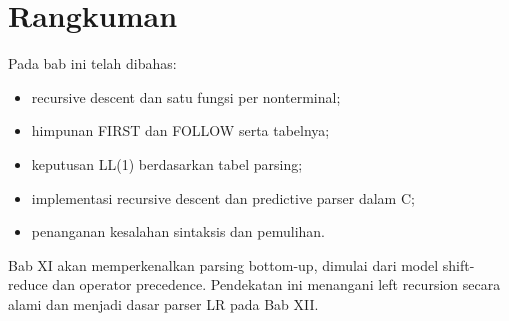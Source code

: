 \section*{Rangkuman}

Pada bab ini telah dibahas:
\begin{itemize}[leftmargin=*]
  \item recursive descent dan satu fungsi per nonterminal;
  \item himpunan FIRST dan FOLLOW serta tabelnya;
  \item keputusan LL(1) berdasarkan tabel parsing;
  \item implementasi recursive descent dan predictive parser dalam C;
  \item penanganan kesalahan sintaksis dan pemulihan.
\end{itemize}

Bab XI akan memperkenalkan parsing bottom-up, dimulai dari model
shift-reduce dan operator precedence. Pendekatan ini menangani
left recursion secara alami dan menjadi dasar parser LR pada Bab XII.
